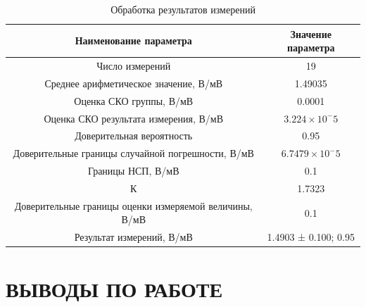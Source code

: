 \documentclass[a4paper,14pt]{article}
\begin{document}
\begin{table}[H]
	\centering
	\caption{Обработка результатов измерений }
	\label{tab:mm_train}
	\begin{tabular}{|c|c|}
		\hline
		Наименование параметра                                 & Значение параметра    \\ \hline
		Число измерений                                        & 19                    \\ \hline
		Среднее арифметическое значение, В/мВ                  & 1.49035               \\ \hline
		Оценка СКО группы, В/мВ                                & 0.0001                \\ \hline
		Оценка СКО результата измерения, В/мВ                  & $3.224 \times 10^-5$  \\ \hline
		Доверительная вероятность                              & 0.95                  \\ \hline
		Доверительные границы случайной погрешности, В/мВ      & $6.7479 \times 10^-5$ \\ \hline
		Границы НСП, В/мВ                                      & 0.1                   \\ \hline
		К                                                      & 1.7323                \\ \hline
		Доверительные границы оценки измеряемой величины, В/мВ & 0.1                   \\ \hline
		Результат измерений, В/мВ                              & 1.4903 ± 0.100; 0.95  \\ \hline
	\end{tabular}
\end{table}
\section{ВЫВОДЫ ПО РАБОТЕ}
\end{document}
